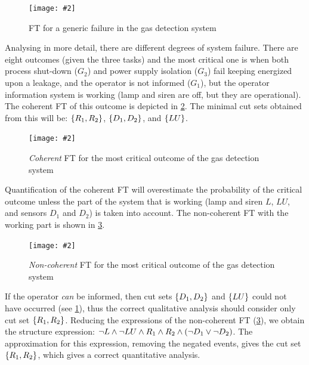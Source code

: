 \documentclass[12pt,openright,twoside,a4paper,oldfontcommands,english,brazil,final]{abntex2}
\theoremstyle{theo}
\newcommand{\includegraphicsaspectratio}[2][1]{%
  \texttt{[image: \#2]}%
}
\newcommand{\setsin}[1]{\ensuremath\left\{ #1 \right\}}
\newcommand{\parsin}[1]{\ensuremath\left( #1 \right)}
\begin{document}
\begin{figure}[htb]
  \centering
  \includegraphicsaspectratio[1]{ft-generic-failure-gas-detection-system}
  \caption{\ac{FT} for a generic failure in the gas detection system}
  \label{fig:ft-generic-failure-gas-detection-system}
\end{figure}

Analysing in more detail, there are different degrees of system failure.
There are eight outcomes (given the three tasks) and the most critical one is when both process shut-down ($G_2$) and power supply isolation ($G_3$) fail keeping energized upon a leakage, and the operator is not informed ($G_1$), but the operator information system is working (lamp and siren are off, but they are operational).
The coherent \ac{FT} of this outcome is depicted in \cref{fig:outcome-4-coherent-ft}.
The minimal cut sets obtained from this will be: $\setsin{R_1, R_2}$, $\setsin{D_1, D_2}$, and $\setsin{LU}$.

\begin{figure}[htb]
  \centering
  \includegraphicsaspectratio[0.5]{outcome-4-coherent-ft}
  \caption{\emph{Coherent} \ac{FT} for the most critical outcome of the gas detection system}
  \label{fig:outcome-4-coherent-ft}
\end{figure}

Quantification of the coherent \ac{FT} will overestimate the probability of the critical outcome unless the part of the system that is working (lamp and siren $L$, $LU$, and sensors $D_1$ and $D_2$) is taken into account.
The non-coherent \ac{FT} with the working part is shown in \cref{fig:outcome-4-non-coherent-ft}.

\begin{figure}[htb]
  \centering
  \includegraphicsaspectratio[0.65]{outcome-4-non-coherent-ft}
  \caption{\emph{Non-coherent} \ac{FT} for the most critical outcome of the gas detection system}
  \label{fig:outcome-4-non-coherent-ft}
\end{figure}

If the operator \emph{can} be informed, then cut sets $\setsin{D_1, D_2}$ and $\setsin{LU}$ could not have occurred (see \cref{fig:ft-generic-failure-gas-detection-system}), thus the correct qualitative analysis should consider only cut set $\setsin{R_1,R_2}$.
Reducing the expressions of the non-coherent \ac{FT} (\cref{fig:outcome-4-non-coherent-ft}), we obtain the structure expression: $\lnot L \land \lnot LU \land R_1 \land R_2 \land \parsin{\lnot D_1 \lor \lnot D_2}$.
{The approximation for this expression, removing the negated events, gives the cut set $\setsin{R_1,R_2}$, which gives a correct quantitative analysis.} 
\end{document}
